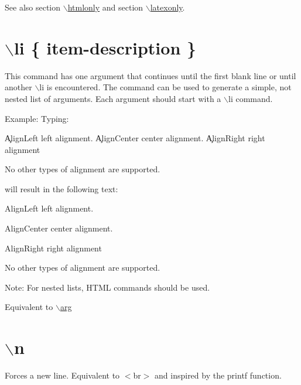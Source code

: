 \begin{DoxySeeAlso}{See also}
section \hyperlink{commands_cmdhtmlonly}{$\backslash$htmlonly} and section \hyperlink{commands_cmdlatexonly}{$\backslash$latexonly}.
\end{DoxySeeAlso}


 \hypertarget{commands_cmdli}{}\section{$\backslash$li \{ item-\/description \}}\label{commands_cmdli}
 This command has one argument that continues until the first blank line or until another $\backslash$li is encountered. The command can be used to generate a simple, not nested list of arguments. Each argument should start with a $\backslash$li command.

\begin{DoxyParagraph}{Example:}
Typing: \begin{DoxyVerb}
  \li \c AlignLeft left alignment.
  \li \c AlignCenter center alignment.
  \li \c AlignRight right alignment
  
  No other types of alignment are supported.
  \end{DoxyVerb}
 will result in the following text:\par
\par
 
\begin{DoxyItemize}
\item {\ttfamily AlignLeft} left alignment. 
\item {\ttfamily AlignCenter} center alignment. 
\item {\ttfamily AlignRight} right alignment 
\end{DoxyItemize}\par
 No other types of alignment are supported.
\end{DoxyParagraph}
\begin{DoxyParagraph}{Note:}
For nested lists, HTML commands should be used.
\end{DoxyParagraph}
Equivalent to \hyperlink{commands_cmdarg}{$\backslash$arg}



 \hypertarget{commands_cmdn}{}\section{$\backslash$n}\label{commands_cmdn}
 Forces a new line. Equivalent to $<$br$>$ and inspired by the printf function.



